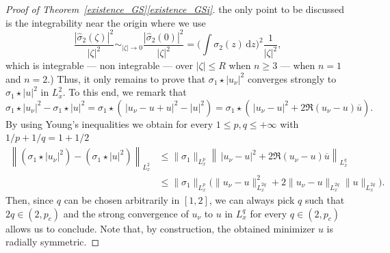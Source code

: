 \documentclass[10pt]{amsart}
\let\bar\oldbar
\theoremstyle{definition}
\let\bar\overline
\newenvironment{ProofOf}[1]{\begin{proof}[Proof of #1]}{\end{proof}}
\newcommand{\ud}{\, {\mathrm{d}}}
\begin{document}
\begin{ProofOf}{Theorem~\ref{existence_GS}\eqref{existence_GSi}}
the only point to be discussed is the integrability near the origin where we use
\[
\frac{|\widehat{\sigma}_{2}(\zeta)|^2}{|\zeta|^2}\sim_{|\zeta|\to 0} \frac{|\widehat{\sigma}_{2}(0)|^2}{|\zeta|^2}
=\biggl(\int \sigma_2(z)\ud z\biggr)^2\frac{1}{|\zeta|^2},
\]
which is integrable --- \resp non integrable --- over $|\zeta|\leq R$ when $n\geq 3$ --- \resp when $n=1$ and $n=2$.)
Thus, it only remains to prove that $\sigma_{1}\star|u_{\nu}|^{2}$ converges strongly to $\sigma_{1}\star|u|^{2}$ in $L_{x}^{2}$. To this end, we remark that
\[
\sigma_{1}\star|u_{\nu}|^{2}-\sigma_{1}\star|u|^{2}=\sigma_{1}\star\left(\,|u_{\nu}-u+u|^{2}-|u|^{2}\right)=\sigma_{1}\star\left(\,|u_{\nu}-u|^{2}+2\Re (u_{\nu}-u)\bar{u}\right).
\]
By using Young's inequalities \cite[Th.\,4.2]{LL} we obtain for every $1\leq p,q\leq+\infty$ with $1/p+1/q=1+1/2$
\begin{align*}
\left\|(\sigma_{1}\star|u_{\nu}|^{2})-(\sigma_{1}\star|u|^{2})\right\|_{L_{x}^{2}}&\leq\|\sigma_{1}\|_{L_{x}^{p}}\left\|\,|u_{\nu}-u|^{2}+2\Re (u_{\nu}-u)\bar{u}\right\|_{L_{x}^{q}}\\
&\leq\|\sigma_{1}\|_{L_{x}^{p}}\bigl(\|u_{\nu}-u\|_{L_{x}^{2q}}^{2}+2\|u_{\nu}-u\|_{L_{x}^{2q}}\|u\|_{L_{x}^{2q}}\bigr).
\end{align*}
Then, since $q$ can be chosen arbitrarily in $[1,2]$, we can always pick $q$ such that $2q\in(2,p_{c})$ and the strong convergence of $u_{\nu}$ to $u$ in $L_{x}^{q}$ for every $q\in(2,p_{c})$ allows us to conclude.
Note that, by construction, the obtained minimizer $u$ is radially symmetric.
\end{ProofOf}
\end{document}
